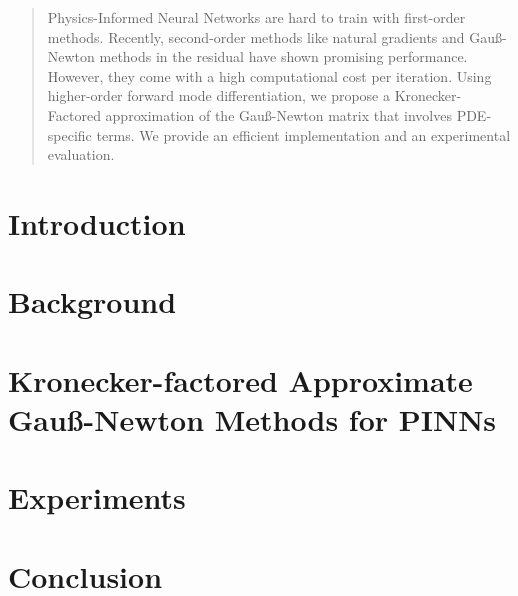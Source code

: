 \documentclass{article}
\begin{document}
\maketitle

\begin{abstract}
  Physics-Informed Neural Networks are hard to train with first-order methods. Recently, second-order methods like natural gradients and Gauß-Newton methods in the residual have shown promising performance. However, they come with a high computational cost per iteration. Using higher-order forward mode differentiation, we propose a Kronecker-Factored approximation of the Gauß-Newton matrix that involves PDE-specific terms. We provide an efficient implementation and an experimental evaluation. 
\end{abstract}

\section{Introduction}


\section{Background}




\section{Kronecker-factored Approximate Gauß-Newton Methods for PINNs}




\section{Experiments}



\section{Conclusion}







\clearpage
\appendix


\end{document}
